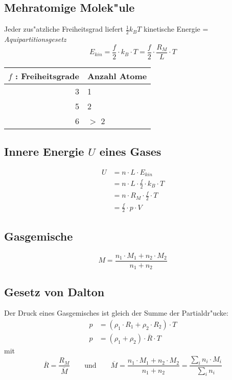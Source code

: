 \subsection{Mehratomige Molek"ule}
Jeder zus"atzliche Freiheitsgrad liefert $\frac{1}{2}k_BT$ kinetische Energie = {\em Aquipartitionsgesetz}
\begin{equation}
	E_{kin}=\frac{f}{2}\cdot k_B\cdot T= \frac{f}{2}\cdot\frac{R_M}{L}\cdot T
\end{equation}
\begin{center}\begin{tabular}{r | l}
	\hline
	$f$ : Freiheitsgrade & Anzahl Atome \\
	\hline
	3	& 1 \\
	5	& 2 \\
	6	& $>$ 2 \\
	\hline
\end{tabular}\end{center}

\subsection{Innere Energie $U$ eines Gases}
\begin{align}
	U	&= n\cdot L\cdot E_{kin} \\
		&= n\cdot L\cdot\frac{f}{2}\cdot k_B\cdot T \\
		&= n\cdot R_M\cdot\frac{f}{2}\cdot T \\
		&= \frac{f}{2}\cdot p\cdot V
\end{align}

\subsection{Gasgemische}
\begin{equation}
	M = \frac{n_1\cdot M_1 + n_2\cdot M_2}{n_1+n_2}
\end{equation}

\subsection{Gesetz von Dalton}
Der Druck eines Gasgemisches ist gleich der Summe der Partialdr"ucke:
\begin{align}
	p &= (\rho_1\cdot R_1+\rho_2\cdot R_2)\cdot T \\
	p &= (\rho_1+\rho_2)\cdot\overline{R}\cdot T
\end{align}
\noindent mit
\begin{equation*}
	\overline{R}=\frac{R_M}{\overline{M}} \qquad\text{und}\qquad
	\overline{M}=\frac{n_1\cdot M_1+n_2\cdot M_2}{n_1+n_2}=\frac{\sum_i n_i\cdot M_i}{\sum_i n_i}
\end{equation*}

